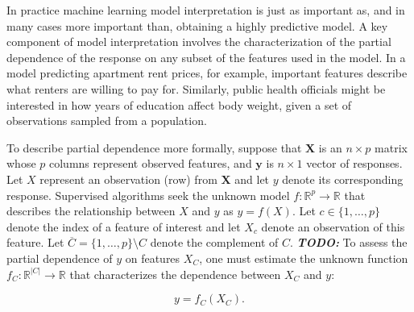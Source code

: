 \documentclass[12pt]{article}
\newcommand{\todo}[1]{{\bf\em TODO:} {{\color{red}{#1}}}}
\begin{document}
In practice machine learning model interpretation is just as important as, and in many cases more important than, obtaining a highly predictive model. A key component of model interpretation involves the characterization of the partial dependence of the response on any subset of the features used in the model. In a model predicting apartment rent prices, for example, important features describe what renters are willing to pay for. Similarly, public health officials might be interested in how years of education affect body weight, given a set of observations sampled from a population.

To describe partial dependence more formally, suppose that $\mathbf{X}$ is an $n \times p$ matrix whose $p$ columns represent observed features, and $\mathbf{y}$ is $n \times 1$ vector of responses. Let $X$ represent an observation (row) from $\mathbf{X}$ and let $y$ denote its corresponding response. Supervised algorithms seek the unknown model $f:\mathbb{R}^{p} \rightarrow \mathbb{R}$ that describes the relationship between $X$ and $y$ as ${y} = f({X}).$ Let $c \in \{1, \ldots, p\}$ denote the index of a feature of interest and let $X_c$ denote an observation of this feature. Let $\overline{C} = \{1, \ldots, p\} \setminus C$ denote the complement of $C$. \todo{cap C not defined as set yet.} To assess the partial dependence of $y$ on features $X_C$, one must estimate the unknown function $f_C: \mathbb{R}^{|C|} \rightarrow \mathbb{R}$ that characterizes the dependence between $X_C$ and $y$:

\begin{equation}\label{problem}
	y = f_C(X_C).
\end{equation}
\end{document}

